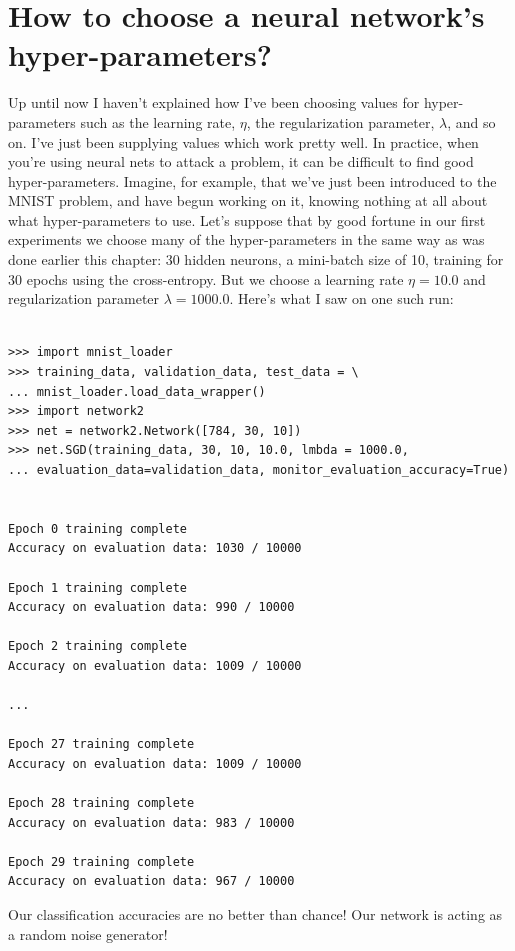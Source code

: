 \documentclass[a4paper,twoside,10pt]{book}
\begin{document}
\section{How to choose a neural network's hyper-parameters?}
Up until now I haven't explained how I've been choosing values for hyper-parameters such as the learning rate, $\eta$, the regularization parameter, $\lambda$, and so on. I've just been supplying values which work pretty well. In practice, when you're using neural nets to attack a problem, it can be difficult to find good hyper-parameters. Imagine, for example, that we've just been introduced to the MNIST problem, and have begun working on it, knowing nothing at all about what hyper-parameters to use. Let's suppose that by good fortune in our first experiments we choose many of the hyper-parameters in the same way as was done earlier this chapter: 30 hidden neurons, a mini-batch size of 10, training for 30 epochs using the cross-entropy. But we choose a learning rate $\eta=10.0$ and regularization parameter $\lambda=1000.0$. Here's what I saw on one such run:

\begin{lstlisting}

>>> import mnist_loader
>>> training_data, validation_data, test_data = \
... mnist_loader.load_data_wrapper()
>>> import network2
>>> net = network2.Network([784, 30, 10])
>>> net.SGD(training_data, 30, 10, 10.0, lmbda = 1000.0,
... evaluation_data=validation_data, monitor_evaluation_accuracy=True)


Epoch 0 training complete
Accuracy on evaluation data: 1030 / 10000

Epoch 1 training complete
Accuracy on evaluation data: 990 / 10000

Epoch 2 training complete
Accuracy on evaluation data: 1009 / 10000

...

Epoch 27 training complete
Accuracy on evaluation data: 1009 / 10000

Epoch 28 training complete
Accuracy on evaluation data: 983 / 10000

Epoch 29 training complete
Accuracy on evaluation data: 967 / 10000
\end{lstlisting}
Our classification accuracies are no better than chance! Our network is acting as a random noise generator!
\end{document}
